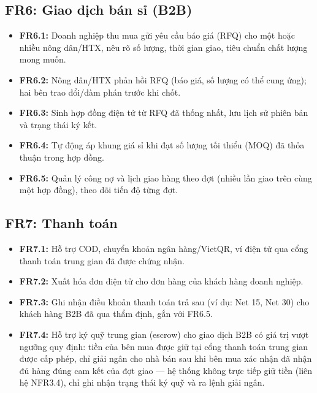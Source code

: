 \subsection{FR6: Giao dịch bán sỉ (B2B)}
\begin{itemize}
    \item \textbf{FR6.1:} Doanh nghiệp thu mua gửi yêu cầu báo giá (RFQ) cho
    một hoặc nhiều nông dân/HTX, nêu rõ số lượng, thời gian giao, tiêu chuẩn
    chất lượng mong muốn.
    \item \textbf{FR6.2:} Nông dân/HTX phản hồi RFQ (báo giá, số lượng có
    thể cung ứng); hai bên trao đổi/đàm phán trước khi chốt.
    \item \textbf{FR6.3:} Sinh hợp đồng điện tử từ RFQ đã thống nhất, lưu
    lịch sử phiên bản và trạng thái ký kết.
    \item \textbf{FR6.4:} Tự động áp khung giá sỉ khi đạt số lượng tối
    thiểu (MOQ) đã thỏa thuận trong hợp đồng.
    \item \textbf{FR6.5:} Quản lý công nợ và lịch giao hàng theo đợt
    (nhiều lần giao trên cùng một hợp đồng), theo dõi tiến độ từng đợt.
\end{itemize}

\subsection{FR7: Thanh toán}
\begin{itemize}
    \item \textbf{FR7.1:} Hỗ trợ COD, chuyển khoản ngân hàng/VietQR, ví
    điện tử qua cổng thanh toán trung gian đã được chứng nhận.
    \item \textbf{FR7.2:} Xuất hóa đơn điện tử cho đơn hàng của khách hàng
    doanh nghiệp.
    \item \textbf{FR7.3:} Ghi nhận điều khoản thanh toán trả sau (ví dụ:
    Net 15, Net 30) cho khách hàng B2B đã qua thẩm định, gắn với FR6.5.
    \item \textbf{FR7.4:} Hỗ trợ ký quỹ trung gian (escrow) cho giao dịch
    B2B có giá trị vượt ngưỡng quy định: tiền của bên mua được giữ tại cổng
    thanh toán trung gian được cấp phép, chỉ giải ngân cho nhà bán sau khi
    bên mua xác nhận đã nhận đủ hàng đúng cam kết của đợt giao --- hệ thống
    không trực tiếp giữ tiền (liên hệ NFR3.4), chỉ ghi nhận trạng thái ký
    quỹ và ra lệnh giải ngân.
\end{itemize}

